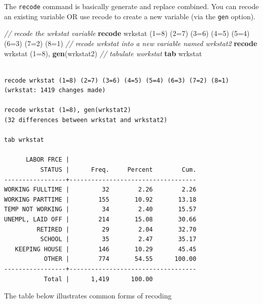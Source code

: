 \documentclass[
]{book}
\newenvironment{Shaded}{\begin{snugshade}}{\end{snugshade}}
\newcommand{\CommentTok}[1]{\textcolor[rgb]{0.56,0.35,0.01}{\textit{#1}}}
\newcommand{\KeywordTok}[1]{\textcolor[rgb]{0.13,0.29,0.53}{\textbf{#1}}}
\newcommand{\NormalTok}[1]{#1}
\begin{document}
The \texttt{recode} command is basically generate and replace combined. You can recode an existing variable OR use recode to create a new variable (via the \texttt{gen} option).

\begin{Shaded}
\begin{Highlighting}[]
  \CommentTok{// recode the wrkstat variable }
  \KeywordTok{recode}\NormalTok{ wrkstat (1=8) (2=7) (3=6) (4=5) (5=4) (6=3) (7=2) (8=1)}
  \CommentTok{// recode wrkstat into a new variable named wrkstat2}
  \KeywordTok{recode}\NormalTok{ wrkstat (1=8), }\KeywordTok{gen}\NormalTok{(wrkstat2)}
  \CommentTok{// tabulate workstat}
  \KeywordTok{tab}\NormalTok{ wrkstat}
\end{Highlighting}
\end{Shaded}

\begin{verbatim}

recode wrkstat (1=8) (2=7) (3=6) (4=5) (5=4) (6=3) (7=2) (8=1)
(wrkstat: 1419 changes made)

recode wrkstat (1=8), gen(wrkstat2)
(32 differences between wrkstat and wrkstat2)

tab wrkstat

      LABOR FRCE |
          STATUS |      Freq.     Percent        Cum.
-----------------+-----------------------------------
WORKING FULLTIME |         32        2.26        2.26
WORKING PARTTIME |        155       10.92       13.18
TEMP NOT WORKING |         34        2.40       15.57
UNEMPL, LAID OFF |        214       15.08       30.66
         RETIRED |         29        2.04       32.70
          SCHOOL |         35        2.47       35.17
   KEEPING HOUSE |        146       10.29       45.45
           OTHER |        774       54.55      100.00
-----------------+-----------------------------------
           Total |      1,419      100.00
\end{verbatim}

The table below illustrates common forms of recoding
\end{document}
